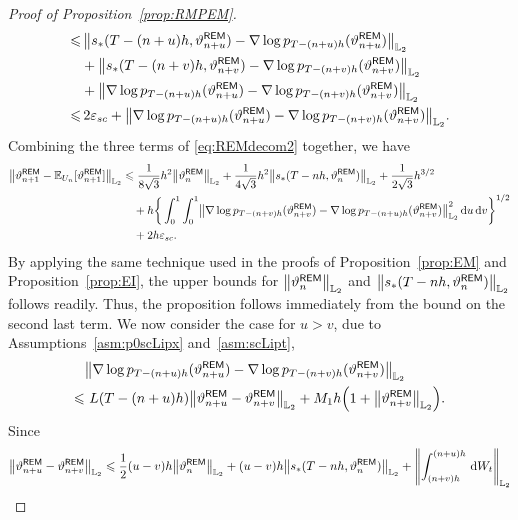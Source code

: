 \begin{proof}[Proof of Proposition~\ref{prop:RMPEM}]
\begin{equation}
\begin{aligned}
        \leqslant&\,\left\lVert s_*(T-(n+u)h,\vartheta_{n+u}^{\sf REM})-\nabla\log p_{T-(n+u)h}(\vartheta_{n+u}^{\sf REM})\right\rVert_{\Ltwo}\\
        &+\left\lVert s_*(T-(n+v)h,\vartheta_{n+v}^{\sf REM})-\nabla\log p_{T-(n+v)h}(\vartheta_{n+v}^{\sf REM})\right\rVert_{\Ltwo}\\
        &+\left\lVert\nabla\log p_{T-(n+u)h}(\vartheta_{n+u}^{\sf REM})-\nabla\log p_{T-(n+v)h}(\vartheta_{n+v}^{\sf REM})\right\rVert_{\Ltwo}\\
        \leqslant& \,2\varepsilon_{sc}+\left\lVert\nabla\log p_{T-(n+u)h}(\vartheta_{n+u}^{\sf REM})-\nabla\log p_{T-(n+v)h}(\vartheta_{n+v}^{\sf REM})\right\rVert_{\Ltwo}.
    \end{aligned}
    \label{eq:diffmatch}
\end{equation}
Combining the three terms of \eqref{eq:REMdecom2} together, we have
\begin{align*}
    \l|\vartheta_{n+1}^{\sf REM}-\mathbb{E}_{U_n}[\vartheta_{n+1}^{\sf REM}]\r|_{\Ltwo}
   & \leqslant \dfrac{1}{8\sqrt{3}}h^2\l|\vartheta_n^{\sf REM}\r|_{\Ltwo}+\dfrac{1}{4\sqrt{3}}h^2\l|s_*(T-nh,\vartheta_n^{\sf REM})\r|_{\Ltwo}+\dfrac{1}{2\sqrt{3}}h^{3/2}\\
    &\quad +h\bigg\{\int_0^1\int_0^1\left\lVert \nabla\log p_{T-(n+v)h}(\vartheta_{n+v}^{\sf REM})-\nabla\log p_{T-(n+u)h}(\vartheta_{n+v}^{\sf REM})\right\rVert_{\Ltwo}^2\rmd u\rmd v\bigg\}^{1/2}\\
    &\quad +2h\varepsilon_{sc}.
\end{align*}
By applying the same technique used in the proofs of Proposition~\ref{prop:EM} and Proposition~\ref{prop:EI}, the upper bounds for $\l|\vartheta_n^{\sf REM}\r|_{\Ltwo}$ and $\l|s_*(T-nh,\vartheta_n^{\sf REM})\r|_{\Ltwo}$ follows readily. Thus, the proposition follows immediately from the bound on the second last term. 
We now consider the case for $u>v$, due to Assumptions~\ref{asm:p0scLipx} and~\ref{asm:scLipt},
\begin{align*}
    &\left\lVert\nabla\log p_{T-(n+u)h}(\vartheta_{n+u}^{\sf REM})-\nabla\log p_{T-(n+v)h}(\vartheta_{n+v}^{\sf REM})\right\rVert_{\Ltwo}\\
    \leqslant &\,\, L(T-(n+u)h)\l|\vartheta_{n+u}^{\sf REM}-\vartheta_{n+v}^{\sf REM}\r|_{\Ltwo}+M_1h\Big(1+\l|\vartheta_{n+v}^{\sf REM}\r|_{\Ltwo}\Big).
\end{align*}
Since
\begin{align*}
    \l|\vartheta_{n+u}^{\sf REM}-\vartheta_{n+v}^{\sf REM}\r|_{\Ltwo}
    &\leqslant \dfrac{1}{2}(u-v)h\l|\vartheta_n^{\sf REM}\r|_{\Ltwo}+(u-v)h\l|s_*(T-nh,\vartheta_{n}^{\sf REM})\r|_{\Ltwo}+\left\lVert\int_{(n+v)h}^{(n+u)h}\rmd W_t\right\rVert_{\Ltwo}\\

\end{align*}
\end{proof}
